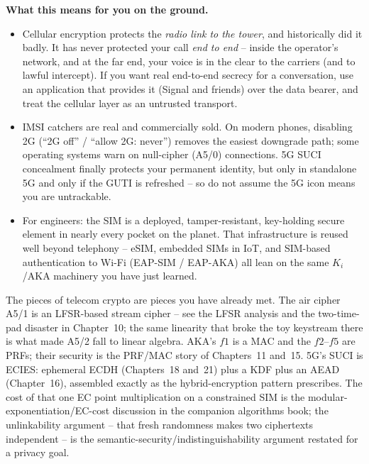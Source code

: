\begin{applicationbox}
\textbf{What this means for you on the ground.}
\begin{itemize}
  \item Cellular encryption protects the \emph{radio link to the tower}, and historically did it badly. It has never protected your call \emph{end to end} -- inside the operator's network, and at the far end, your voice is in the clear to the carriers (and to lawful intercept). If you want real end-to-end secrecy for a conversation, use an application that provides it (Signal and friends) over the data bearer, and treat the cellular layer as an untrusted transport.
  \item IMSI catchers are real and commercially sold. On modern phones, disabling 2G (``2G off'' / ``allow 2G: never'') removes the easiest downgrade path; some operating systems warn on null-cipher (A5/0) connections. 5G SUCI concealment finally protects your permanent identity, but only in standalone 5G and only if the GUTI is refreshed -- so do not assume the 5G icon means you are untrackable.
  \item For engineers: the SIM is a deployed, tamper-resistant, key-holding secure element in nearly every pocket on the planet. That infrastructure is reused well beyond telephony -- eSIM, embedded SIMs in IoT, and SIM-based authentication to Wi-Fi (EAP-SIM / EAP-AKA) all lean on the same $K_i$/AKA machinery you have just learned.
  \end{itemize}
\end{applicationbox}

\begin{connectionbox}
The pieces of telecom crypto are pieces you have already met. The air cipher A5/1 is an LFSR-based stream cipher -- see the LFSR analysis and the two-time-pad disaster in Chapter~10; the same linearity that broke the toy keystream there is what made A5/2 fall to linear algebra. AKA's $f1$ is a MAC and the $f2$--$f5$ are PRFs; their security is the PRF/MAC story of Chapters~11 and~15. 5G's SUCI is ECIES: ephemeral ECDH (Chapters~18 and~21) plus a KDF plus an AEAD (Chapter~16), assembled exactly as the hybrid-encryption pattern prescribes. The cost of that one EC point multiplication on a constrained SIM is the modular-exponentiation/EC-cost discussion in the companion algorithms book; the unlinkability argument -- that fresh randomness makes two ciphertexts independent -- is the semantic-security/indistinguishability argument restated for a privacy goal.
\end{connectionbox}

